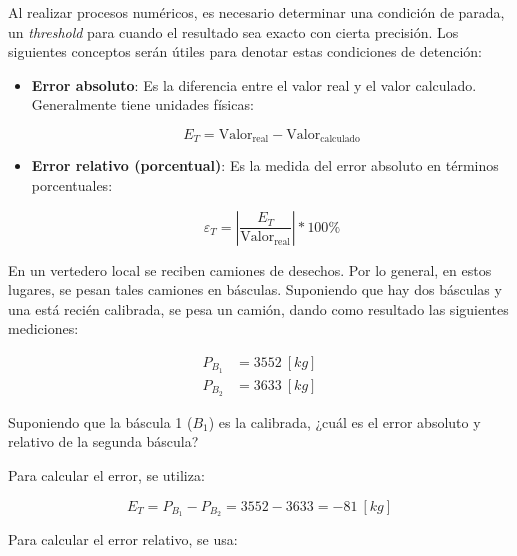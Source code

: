 Al realizar procesos numéricos, es necesario determinar una condición de
parada, un \emph{threshold} para cuando el resultado sea exacto con
cierta precisión. Los siguientes conceptos serán útiles para denotar
estas condiciones de detención:

\begin{itemize}
    \item
        \textbf{Error absoluto}: Es la diferencia entre el valor real y el
        valor calculado. Generalmente tiene unidades físicas:

        \begin{equation*}{
                E_T = \text{Valor}_{\text{real}} - \text{Valor}_{\text{calculado}}
        }\end{equation*}
    \item
        \textbf{Error relativo (porcentual)}: Es la medida del error absoluto
        en términos porcentuales:

        \begin{equation*}{
                \varepsilon_{T} = \left| {\frac{E_T}{\text{Valor}_{\text{real}}}} \right| * 100 \%
        }\end{equation*}
\end{itemize}


\begin{ex}

    En un vertedero local se reciben camiones de desechos. Por lo general,
    en estos lugares, se pesan tales camiones en básculas. Suponiendo que
    hay dos básculas y una está recién calibrada, se pesa un camión, dando
    como resultado las siguientes mediciones:

    \begin{eqnarray*}
        P_{B_1} &= 3552\ [\si{kg}] \\
        P_{B_2} &= 3633\ [\si{kg}]
    \end{eqnarray*}

    Suponiendo que la báscula 1 (\(B_1\)) es la calibrada, ¿cuál es el error
    absoluto y relativo de la segunda báscula?

    \begin{solution}
        Para calcular el error, se utiliza:

        \begin{equation*}{
                E_T = P_{B_1} - P_{B_2} = 3552 - 3633 = -81\ [\si{kg}]
        }\end{equation*}

        Para calcular el error relativo, se usa:

        \begin{center}
        \end{center}

    \end{solution}


\end{ex}


